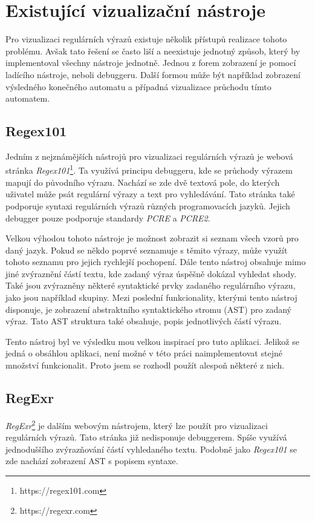 \chapter{Existující vizualizační nástroje}\label{sec:ExistingApplications}

Pro vizualizaci regulárních výrazů existuje několik přístupů realizace tohoto problému.
Avšak tato řešení se často liší a neexistuje jednotný způsob, který by implementoval všechny nástroje jednotně.
Jednou z forem zobrazení je pomocí ladícího nástroje, neboli debuggeru.
Další formou může být například zobrazení výsledného konečného automatu a případná vizualizace průchodu tímto automatem.

\section{Regex101}

Jedním z nejznámějších nástrojů pro vizualizaci regulárních výrazů je webová stránka \textit{Regex101}\footnote{https://regex101.com}.
Ta využívá principu debuggeru, kde se průchody výrazem mapují do původního výrazu.
Nachází se zde dvě textová pole, do kterých uživatel může psát regulární výrazy a text pro vyhledávání.
Tato stránka také podporuje syntaxi regulárních výrazů různých programovacích jazyků.
Jejich debugger pouze podporuje standardy \textit{PCRE} a \textit{PCRE2}.

Velkou výhodou tohoto nástroje je možnost zobrazit si seznam všech vzorů pro daný jazyk.
Pokud se někdo poprvé seznamuje s těmito výrazy, může využít tohoto seznamu pro jejich rychlejší pochopení.
Dále tento nástroj obsahuje mimo jiné zvýraznění částí textu, kde zadaný výraz úspěšně dokázal vyhledat shody.
Také jsou zvýrazněny některé syntaktické prvky zadaného regulárního výrazu, jako jsou například skupiny.
Mezi poslední funkcionality, kterými tento nástroj disponuje, je zobrazení abstraktního syntaktického stromu (AST) pro zadaný výraz.
Tato AST struktura také obsahuje, popis jednotlivých částí výrazu.

Tento nástroj byl ve výsledku mou velkou inspirací pro tuto aplikaci. 
Jelikož se jedná o obsáhlou aplikaci, není možné v této práci naimplementovat stejné množství funkcionalit.
Proto jsem se rozhodl použít alespoň některé z nich.

\section{RegExr}

\textit{RegExr}\footnote{https://regexr.com} je dalším webovým nástrojem, který lze použít pro vizualizaci regulárních výrazů.
Tato stránka již nedisponuje debuggerem.
Spíše využívá jednoduššího zvýrazňování částí vyhledaného textu.
Podobně jako \textit{Regex101} se zde nachází zobrazení AST s popisem syntaxe.

